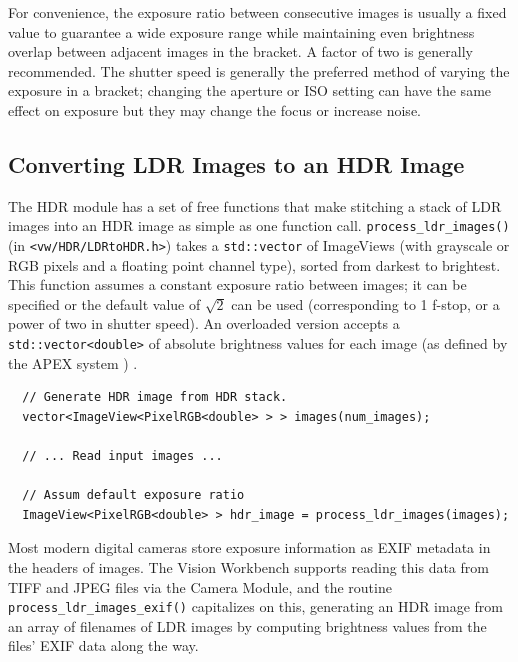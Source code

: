 For convenience, the exposure ratio between consecutive images is
usually a fixed value to guarantee a wide exposure range while
maintaining even brightness overlap between adjacent images in the
bracket. A factor of two is generally recommended.  The shutter speed
is generally the preferred method of varying the exposure in a
bracket; changing the aperture or ISO setting can have the same effect
on exposure but they may change the focus or increase noise.

\subsection{Converting LDR Images to an HDR Image}
The HDR module has a set of free functions that make stitching a stack
of LDR images into an HDR image as simple as one function
call. \verb#process_ldr_images()# (in \verb#<vw/HDR/LDRtoHDR.h>#)
takes a \verb#std::vector# of ImageViews (with grayscale or RGB pixels
and a floating point channel type), sorted from darkest to
brightest. This function assumes a constant exposure ratio between
images; it can be specified or the default value of $\sqrt{2}$ can be
used (corresponding to 1 f-stop, or a power of two in shutter
speed). An overloaded version accepts a \verb#std::vector<double># of
absolute brightness values for each image (as defined by the APEX
system \cite{apex}) .

\begin{verbatim}
  // Generate HDR image from HDR stack. 
  vector<ImageView<PixelRGB<double> > > images(num_images);
  
  // ... Read input images ...

  // Assum default exposure ratio
  ImageView<PixelRGB<double> > hdr_image = process_ldr_images(images);
\end{verbatim}

Most modern digital cameras store exposure information as EXIF
metadata in the headers of images.  The Vision Workbench supports
reading this data from TIFF and JPEG files via the Camera Module, and
the routine \verb#process_ldr_images_exif()# capitalizes on this,
generating an HDR image from an array of filenames of LDR images by
computing brightness values from the files' EXIF data along the
way. 


